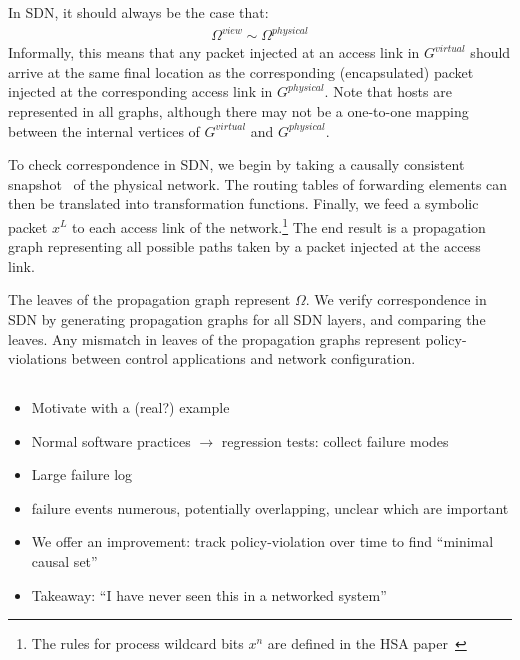 In SDN, it should always be the case that:
\begin{align*}
\Omega^{view} \sim \Omega^{physical}
\end{align*}
Informally, this means that any packet injected at an access link in $G^{virtual}$ should arrive at
the same final location as the corresponding (encapsulated) packet injected at the
corresponding access link in $G^{physical}$. Note that hosts are represented
in all graphs, although there may not be a one-to-one mapping between the
internal vertices of $G^{virtual}$ and $G^{physical}$.

To check correspondence in SDN, we begin by taking a causally consistent
snapshot~\cite{Chandy:1985:DSD:214451.214456} of the physical network. The routing
tables of forwarding elements can then be translated into transformation functions.
Finally, we feed a symbolic packet $x^L$ to each access link of the
network.\footnote{The rules for process wildcard bits $x^n$ are defined in
the HSA paper~\cite{hsa}} The end result is a propagation graph representing all possible paths taken by a packet injected
at the access link.

The leaves of the propagation graph represent $\Omega$. We
verify correspondence in SDN by generating propagation graphs for all SDN layers,
and comparing the leaves. Any mismatch in leaves of the propagation graphs
represent policy-violations between control applications and network
configuration.

\subsection{\SIMULATOR{}}


\begin{itemize}
\item Motivate with a (real?) example
\item Normal software practices $\rightarrow$ regression tests: collect failure modes
\item Large failure log
\item failure events numerous, potentially overlapping, unclear which are important
\item We offer an improvement: track policy-violation over time to find ``minimal causal set''
\item Takeaway: ``I have never seen this in a networked system''
\end{itemize}

